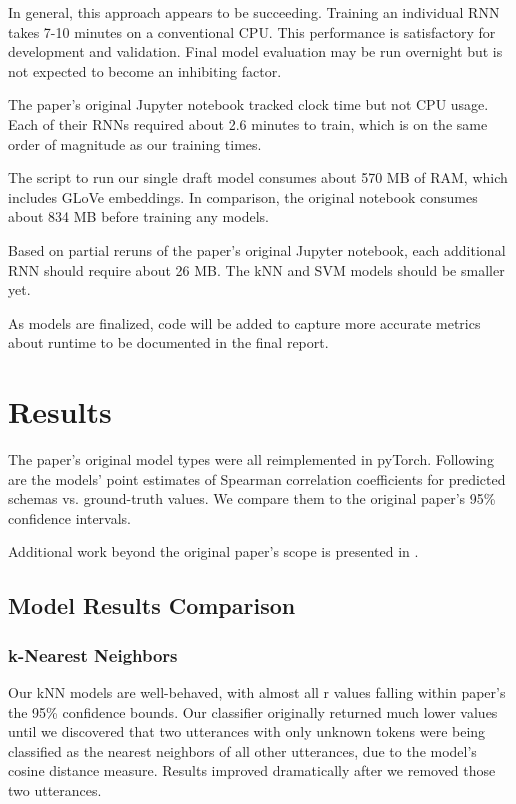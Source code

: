 \documentclass[11pt,a4paper]{article}
\begin{document}
In general, this approach appears to be succeeding. Training an individual RNN takes 7-10 minutes on a conventional CPU. This performance is satisfactory for development and validation. Final model evaluation may be run overnight but is not expected to become an inhibiting factor. 

The paper's original Jupyter notebook tracked clock time but not CPU usage. Each of their RNNs required about 2.6 minutes to train, which is on the same order of magnitude as our training times.

The script to run our single draft model consumes about 570 MB of RAM, which includes GLoVe embeddings. In comparison, the original notebook consumes about 834 MB before training any models.

Based on partial reruns of the paper's original Jupyter notebook, each additional RNN should require about 26 MB. The kNN and SVM models should be smaller yet.

As models are finalized, code will be added to capture more accurate metrics about runtime to be documented in the final report. 

\section{Results}
The paper's original model types were all reimplemented in pyTorch. Following are the models' point estimates of Spearman correlation coefficients for predicted schemas vs. ground-truth values. We compare them to the original paper's 95\% confidence intervals.

Additional work beyond the original paper's scope is presented in .

\subsection{Model Results Comparison}
\label{section_model_results}
\subsubsection{k-Nearest Neighbors}

Our kNN models are well-behaved, with almost all r values falling within paper's the 95\% confidence bounds. Our classifier originally returned much lower values until we discovered that two utterances with only unknown tokens were being classified as the nearest neighbors of all other utterances, due to the model's cosine distance measure. Results improved dramatically after we removed those two utterances.
\end{document}
